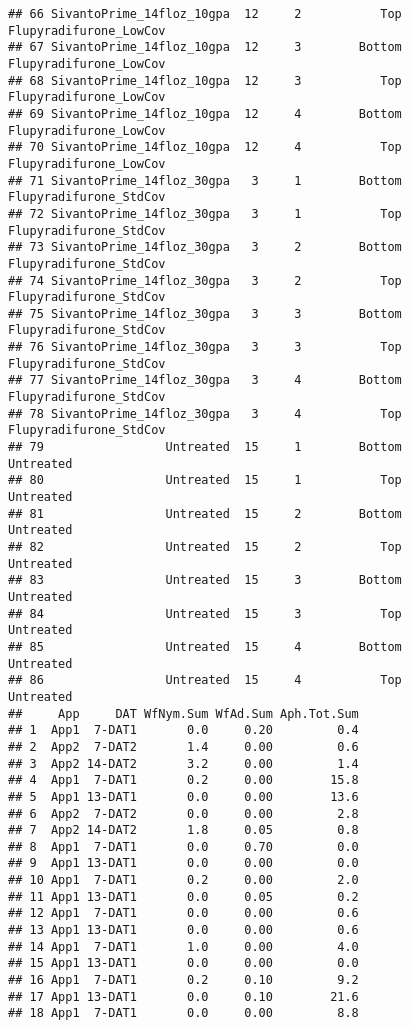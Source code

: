 \documentclass[
]{article}
\begin{document}
\begin{verbatim}
## 66 SivantoPrime_14floz_10gpa  12     2           Top Flupyradifurone_LowCov
## 67 SivantoPrime_14floz_10gpa  12     3        Bottom Flupyradifurone_LowCov
## 68 SivantoPrime_14floz_10gpa  12     3           Top Flupyradifurone_LowCov
## 69 SivantoPrime_14floz_10gpa  12     4        Bottom Flupyradifurone_LowCov
## 70 SivantoPrime_14floz_10gpa  12     4           Top Flupyradifurone_LowCov
## 71 SivantoPrime_14floz_30gpa   3     1        Bottom Flupyradifurone_StdCov
## 72 SivantoPrime_14floz_30gpa   3     1           Top Flupyradifurone_StdCov
## 73 SivantoPrime_14floz_30gpa   3     2        Bottom Flupyradifurone_StdCov
## 74 SivantoPrime_14floz_30gpa   3     2           Top Flupyradifurone_StdCov
## 75 SivantoPrime_14floz_30gpa   3     3        Bottom Flupyradifurone_StdCov
## 76 SivantoPrime_14floz_30gpa   3     3           Top Flupyradifurone_StdCov
## 77 SivantoPrime_14floz_30gpa   3     4        Bottom Flupyradifurone_StdCov
## 78 SivantoPrime_14floz_30gpa   3     4           Top Flupyradifurone_StdCov
## 79                 Untreated  15     1        Bottom              Untreated
## 80                 Untreated  15     1           Top              Untreated
## 81                 Untreated  15     2        Bottom              Untreated
## 82                 Untreated  15     2           Top              Untreated
## 83                 Untreated  15     3        Bottom              Untreated
## 84                 Untreated  15     3           Top              Untreated
## 85                 Untreated  15     4        Bottom              Untreated
## 86                 Untreated  15     4           Top              Untreated
##     App     DAT WfNym.Sum WfAd.Sum Aph.Tot.Sum
## 1  App1  7-DAT1       0.0     0.20         0.4
## 2  App2  7-DAT2       1.4     0.00         0.6
## 3  App2 14-DAT2       3.2     0.00         1.4
## 4  App1  7-DAT1       0.2     0.00        15.8
## 5  App1 13-DAT1       0.0     0.00        13.6
## 6  App2  7-DAT2       0.0     0.00         2.8
## 7  App2 14-DAT2       1.8     0.05         0.8
## 8  App1  7-DAT1       0.0     0.70         0.0
## 9  App1 13-DAT1       0.0     0.00         0.0
## 10 App1  7-DAT1       0.2     0.00         2.0
## 11 App1 13-DAT1       0.0     0.05         0.2
## 12 App1  7-DAT1       0.0     0.00         0.6
## 13 App1 13-DAT1       0.0     0.00         0.6
## 14 App1  7-DAT1       1.0     0.00         4.0
## 15 App1 13-DAT1       0.0     0.00         0.0
## 16 App1  7-DAT1       0.2     0.10         9.2
## 17 App1 13-DAT1       0.0     0.10        21.6
## 18 App1  7-DAT1       0.0     0.00         8.8

\end{verbatim}
\end{document}
